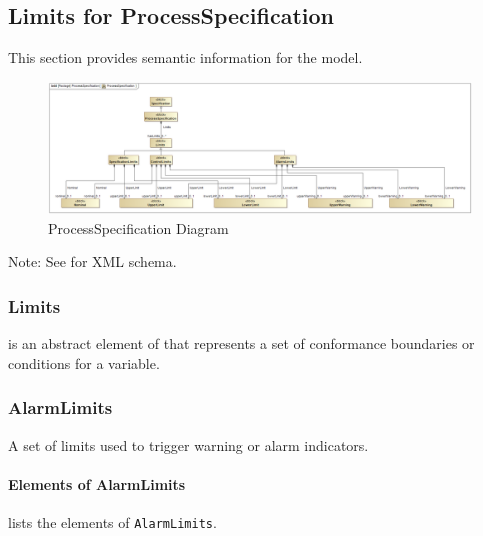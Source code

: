 \subsection{Limits for ProcessSpecification} \label{sec:Limits for ProcessSpecification}


This section provides semantic information for the  model.

\begin{figure}[ht]
  \centering
    \includegraphics[width=1.0\textwidth]{figures/ProcessSpecification.png}
  \caption{ProcessSpecification Diagram}
  \label{fig:ProcessSpecification Diagram}
\end{figure}

\FloatBarrier


Note: See  for XML schema.


\subsubsection{Limits}
\label{sec:Limits}



 is an abstract element of  that represents a set of conformance boundaries or conditions for a variable.



\subsubsection{AlarmLimits}
\label{sec:AlarmLimits}



A set of limits used to trigger warning or alarm indicators.


\paragraph{Elements of AlarmLimits}\mbox{}
\label{sec:Elements of AlarmLimits}

 lists the elements of \texttt{AlarmLimits}.

